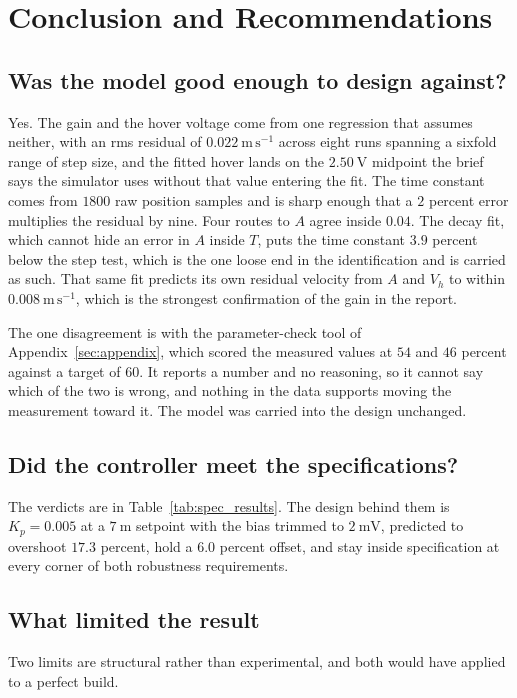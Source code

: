 \section{Conclusion and Recommendations}\label{sec:conclusion}
\subsection{Was the model good enough to design against?}
Yes. The gain and the hover voltage come from one regression that assumes neither, with an rms
residual of $0.022\ \mathrm{m\,s^{-1}}$ across eight runs spanning a sixfold range of step size,
and the fitted hover lands on the $2.50\ \mathrm{V}$ midpoint the brief says the simulator uses
without that value entering the fit. The time constant comes from $1800$ raw position samples and
is sharp enough that a $2$ percent error multiplies the residual by nine. Four routes to $A$ agree
inside $0.04$. The decay fit, which cannot hide an error in $A$ inside $T$, puts the time
constant $3.9$ percent below the step test, which is the one loose end in the identification and is
carried as such. That same fit predicts its own residual velocity from $A$ and $V_h$ to within
$0.008\ \mathrm{m\,s^{-1}}$, which is the strongest confirmation of the gain in the report.

The one disagreement is with the parameter-check tool of Appendix~\ref{sec:appendix}, which scored
the measured values at $54$ and $46$ percent against a target of $60$. It reports a number and no
reasoning, so it cannot say which of the two is wrong, and nothing in the data supports moving the
measurement toward it. The model was carried into the design unchanged.

\subsection{Did the controller meet the specifications?}
The verdicts are in Table~\ref{tab:spec_results}. The design behind them is $K_p = 0.005$ at a
$7\ \mathrm{m}$ setpoint with the bias trimmed to $2\ \mathrm{mV}$, predicted to overshoot
$17.3$ percent, hold a $6.0$ percent offset, and stay inside specification at every corner of both
robustness requirements.

\subsection{What limited the result}
Two limits are structural rather than experimental, and both would have applied to a perfect
build.

